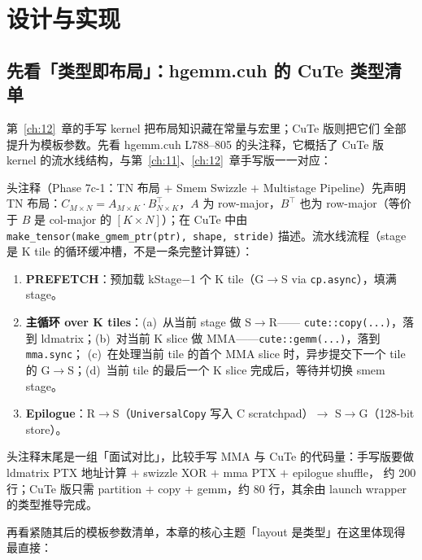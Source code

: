 \section{设计与实现}

\subsection{先看「类型即布局」：hgemm.cuh 的 CuTe 类型清单}

第~\ref{ch:12}~章的手写 kernel 把布局知识藏在常量与宏里；CuTe 版则把它们
全部提升为模板参数。先看 hgemm.cuh L788--805 的头注释，它概括了 CuTe 版
kernel 的流水线结构，与第~\ref{ch:11}、\ref{ch:12}~章手写版一一对应：

头注释（Phase 7c-1：TN 布局 $+$ Smem Swizzle $+$ Multistage Pipeline）先声明
TN 布局：$C_{M \times N} = A_{M \times K} \cdot B^{\top}_{N \times K}$，$A$
为 row-major，$B^{\top}$ 也为 row-major（等价于 $B$ 是 col-major 的
$[K \times N]$）；在 CuTe 中由
\texttt{make\_\allowbreak{}tensor\allowbreak{}(make\_\allowbreak{}gmem\_\allowbreak{}ptr\allowbreak{}(ptr),\allowbreak{} shape,\allowbreak{} stride)}
描述。流水线流程（stage 是 K tile 的循环缓冲槽，不是一条完整计算链）：

\begin{enumerate}
  \item \textbf{PREFETCH}：预加载 kStage$-$1 个 K tile（G$\to$S via
        \texttt{cp.async}），填满 stage。
  \item \textbf{主循环 over K tiles}：(a)~从当前 stage 做 S$\to$R——
        \texttt{cute::copy(...)}，落到 ldmatrix；(b)~对当前 K slice 做
        MMA——\texttt{cute::gemm(...)}，落到 \texttt{mma.sync}；
        (c)~在处理当前 tile 的首个 MMA slice 时，异步提交下一个 tile 的
        G$\to$S；(d)~当前 tile 的最后一个 K slice 完成后，等待并切换
        smem stage。
  \item \textbf{Epilogue}：R$\to$S（\texttt{UniversalCopy} 写入 C
        scratchpad）$\to$ S$\to$G（128-bit store）。
\end{enumerate}

头注释末尾是一组「面试对比」，比较手写 MMA 与 CuTe 的代码量：手写版要做
ldmatrix PTX 地址计算 $+$ swizzle XOR $+$ mma PTX $+$ epilogue shuffle，
约 200 行；CuTe 版只需 partition $+$ copy $+$ gemm，约 80 行，其余由
launch wrapper 的类型推导完成。

再看紧随其后的模板参数清单，本章的核心主题「layout 是类型」在这里体现得最直接：



